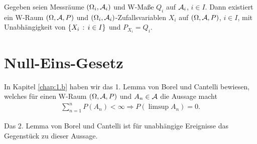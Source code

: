 \begin{bem}
\label{bem:5.6}
Gegeben seien Messräume $(\Omega_{i}, \AA_{i})$ und
W-Maße $Q_{i}$ auf $\AA_{i}$, $i\in I$. Dann existiert ein W-Raum $(\Omega,
{\cal A }, P)$ und $(\Omega_{i}, \AA_{i})$-Zufallsvariablen $X_{i}$ auf $(\Omega,
\AA, P)$, $i \in I$, mit Unabhängigkeit von $\setdef{X_{i}}{i \in I}$ und
$P_{X_{i}}=Q_{i}$.\maphere
\end{bem}

\section{Null-Eins-Gesetz}

In Kapitel \ref{chap:1.b} haben wir das 1. Lemma von Borel und Cantelli
bewiesen, welches für einen W-Raum $(\Omega,\AA,P)$ und $A_n\in\AA$ die Aussage
macht
\begin{align*}
\sum\limits_{n=1}^n P(A_n)<\infty\Rightarrow P(\limsup A_n) = 0.
\end{align*}

Das 2. Lemma von Borel und Cantelli ist für unabhängige Ereignisse 
das Gegenstück zu dieser Aussage.

